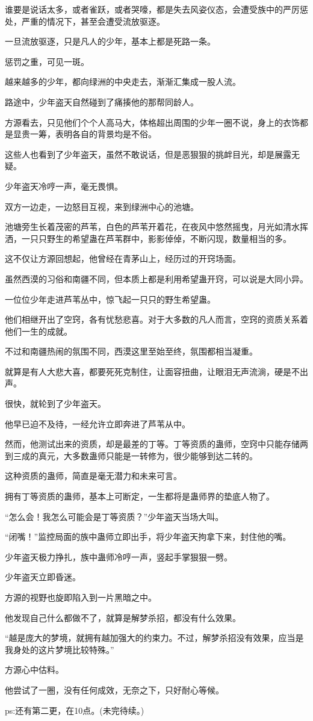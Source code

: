\begin{this_body}
谁要是说话太多，或者雀跃，或者哭嚎，都是失去风姿仪态，会遭受族中的严厉惩处，严重的情况下，甚至会遭受流放驱逐。

一旦流放驱逐，只是凡人的少年，基本上都是死路一条。

惩罚之重，可见一斑。

越来越多的少年，都向绿洲的中央走去，渐渐汇集成一股人流。

路途中，少年盗天自然碰到了痛揍他的那帮同龄人。

方源看去，只见他们个个人高马大，体格超出周围的少年一圈不说，身上的衣饰都是显贵一筹，表明各自的背景均是不俗。

这些人也看到了少年盗天，虽然不敢说话，但是恶狠狠的挑衅目光，却是展露无疑。

少年盗天冷哼一声，毫无畏惧。

双方一边走，一边怒目互视，来到绿洲中心的池塘。

池塘旁生长着茂密的芦苇，白色的芦苇开着花，在夜风中悠然摇曳，月光如清水挥洒，一只只野生的希望蛊在芦苇群中，影影倬倬，不断闪现，数量相当的多。

这不仅让方源回想起，他曾经在青茅山上，经历过的开窍场面。

虽然西漠的习俗和南疆不同，但本质上都是利用希望蛊开窍，可以说是大同小异。

一位位少年走进芦苇丛中，惊飞起一只只的野生希望蛊。

他们相继开出了空窍，各有忧愁悲喜。对于大多数的凡人而言，空窍的资质关系着他们一生的成就。

不过和南疆热闹的氛围不同，西漠这里至始至终，氛围都相当凝重。

就算是有人大悲大喜，都要死死克制住，让面容扭曲，让眼泪无声流淌，硬是不出声。

很快，就轮到了少年盗天。

他早已迫不及待，一经允许立即奔进了芦苇从中。

然而，他测试出来的资质，却是最差的丁等。丁等资质的蛊师，空窍中只能存储两到三成的真元，大多数蛊师只能是一转修为，很少能够到达二转的。

这种资质的蛊师，简直是毫无潜力和未来可言。

拥有丁等资质的蛊师，基本上可断定，一生都将是蛊师界的垫底人物了。

“怎么会！我怎么可能会是丁等资质？”少年盗天当场大叫。

“闭嘴！”监控局面的族中蛊师立即出手，将少年盗天拘拿下来，封住他的嘴。

少年盗天极力挣扎，族中蛊师冷哼一声，竖起手掌狠狠一劈。

少年盗天立即昏迷。

方源的视野也旋即陷入到一片黑暗之中。

他发现自己什么都做不了，就算是解梦杀招，都没有什么效果。

“越是庞大的梦境，就拥有越加强大的约束力。不过，解梦杀招没有效果，应当是我身处的这片梦境比较特殊。”

方源心中估料。

他尝试了一圈，没有任何成效，无奈之下，只好耐心等候。

ps:还有第二更，在10点。(未完待续。)

\end{this_body}

